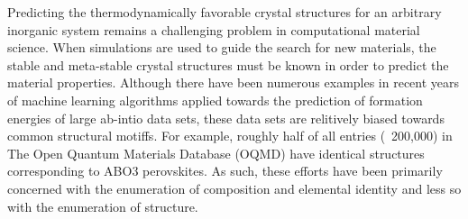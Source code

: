 

Predicting the thermodynamically favorable crystal structures for an arbitrary inorganic system remains a challenging problem in computational material science.
%
%
When simulations are used to guide the search for new materials, the stable and meta-stable crystal structures must be known in order to predict the material properties.
Although there have been numerous examples in recent years of machine learning algorithms applied towards the prediction of formation energies of large ab-intio data sets, these data sets are relitively biased towards common structural motiffs.
%
For example, roughly half of all entries (~200,000) in The Open Quantum Materials Database (OQMD) have identical structures corresponding to ABO3 perovskites.
As such, these efforts have been primarily concerned with the enumeration of composition and elemental identity and less so with the enumeration of structure.
